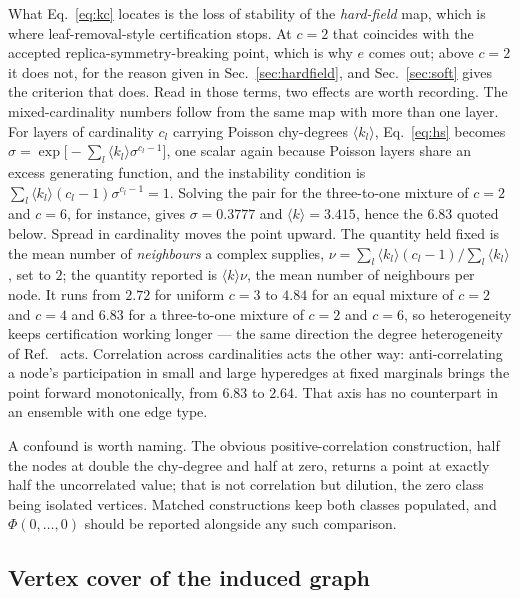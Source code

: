 \documentclass[aps,pre,twocolumn,superscriptaddress,floatfix]{revtex4-2}
\newcommand{\ave}[1]{\langle #1 \rangle}
\begin{document}
What Eq.~\eqref{eq:kc} locates is the loss of stability of the \emph{hard-field}
map, which is where leaf-removal-style certification stops. At $c=2$ that
coincides with the accepted replica-symmetry-breaking point, which is why $e$
comes out; above $c=2$ it does not, for the reason given in
Sec.~\ref{sec:hardfield}, and Sec.~\ref{sec:soft} gives the criterion that does.
Read in those terms, two effects are worth recording. The mixed-cardinality numbers follow from the same map with more than one layer.
For layers of cardinality $c_l$ carrying Poisson chy-degrees $\ave{k_l}$,
Eq.~\eqref{eq:hs} becomes
$\sigma=\exp\!\big[-\sum_l\ave{k_l}\sigma^{c_l-1}\big]$, one scalar again
because Poisson layers share an excess generating function, and the instability
condition is $\sum_l\ave{k_l}(c_l-1)\sigma^{c_l-1}=1$. Solving the pair for the
three-to-one mixture of $c=2$ and $c=6$, for instance, gives $\sigma=0.3777$ and
$\ave{k}=3.415$, hence the $6.83$ quoted below. Spread in cardinality
moves the point upward. The quantity held fixed is the mean number of
\emph{neighbours} a complex supplies, $\nu=\sum_l\ave{k_l}(c_l-1)/\sum_l\ave{k_l}$,
set to $2$; the quantity reported is $\ave{k}\nu$, the mean number of neighbours
per node. It runs from $2.72$ for uniform $c=3$ to $4.84$ for an equal mixture
of $c=2$ and $c=4$ and $6.83$ for a three-to-one mixture of $c=2$ and $c=6$, so
heterogeneity keeps certification working longer --- the same direction the
degree heterogeneity of Ref.~\cite{VW03} acts. Correlation across cardinalities
acts the other way: anti-correlating a node's participation in small and large
hyperedges at fixed marginals brings the point forward monotonically, from
$6.83$ to $2.64$. That axis has no counterpart in an ensemble with one edge
type.

A confound is worth naming. The obvious positive-correlation construction, half
the nodes at double the chy-degree and half at zero, returns a point at exactly
half the uncorrelated value; that is not correlation but dilution, the zero class
being isolated vertices. Matched constructions keep both classes populated, and
$\Phi(0,\dots,0)$ should be reported alongside any such comparison.

\subsection{Vertex cover of the induced graph}
\label{sec:cover}
\end{document}
